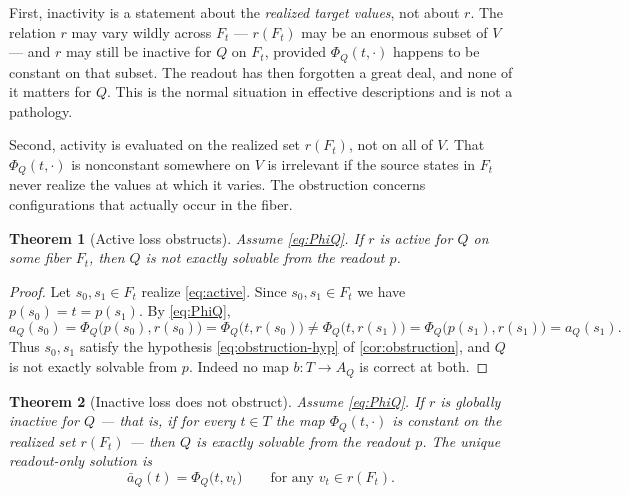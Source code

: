 \documentclass[11pt,reqno]{amsart}
\theoremstyle{plain}
\newtheorem{theorem}{Theorem}[section]
\theoremstyle{definition}
\newcommand{\Rdt}{T}
\begin{document}
First, inactivity is a statement about the \emph{realized target values}, not about $r$. The
relation $r$ may vary wildly across $F_t$ --- $r(F_t)$ may be an enormous subset of $V$ --- and
$r$ may still be inactive for $Q$ on $F_t$, provided $\Phi_Q(t,\cdot)$ happens to be constant on
that subset. The readout has then forgotten a great deal, and none of it matters for $Q$. This
is the normal situation in effective descriptions and is not a pathology.

Second, activity is evaluated on the realized set $r(F_t)$, not on all of $V$. That
$\Phi_Q(t,\cdot)$ is nonconstant somewhere on $V$ is irrelevant if the source states in $F_t$
never realize the values at which it varies. The obstruction concerns configurations that
actually occur in the fiber.

\begin{theorem}[Active loss obstructs]\label{thm:active-obstructs}
Assume \eqref{eq:PhiQ}. If $r$ is active for $Q$ on some fiber $F_{t}$, then $Q$ is not exactly
solvable from the readout $p$.
\end{theorem}

\begin{proof}
Let $s_0,s_1\in F_{t}$ realize \eqref{eq:active}. Since $s_0,s_1\in F_{t}$ we have
$p(s_0)=t=p(s_1)$. By \eqref{eq:PhiQ},
\begin{equation*}
a_Q(s_0)=\Phi_Q\bigl(p(s_0),r(s_0)\bigr)=\Phi_Q\bigl(t,r(s_0)\bigr)
\neq
\Phi_Q\bigl(t,r(s_1)\bigr)=\Phi_Q\bigl(p(s_1),r(s_1)\bigr)=a_Q(s_1).
\end{equation*}
Thus $s_0,s_1$ satisfy the hypothesis \eqref{eq:obstruction-hyp} of \cref{cor:obstruction}, and
$Q$ is not exactly solvable from $p$. Indeed no map $b\colon\Rdt\to A_Q$ is correct at both.
\end{proof}

\begin{theorem}[Inactive loss does not obstruct]\label{thm:inactive-preserves}
Assume \eqref{eq:PhiQ}. If $r$ is globally inactive for $Q$ --- that is, if for every $t\in\Rdt$
the map $\Phi_Q(t,\cdot)$ is constant on the realized set $r(F_t)$ --- then $Q$ \emph{is} exactly
solvable from the readout $p$. The unique readout-only solution is
\begin{equation}\label{eq:inactive-solution}
\bar a_Q(t)=\Phi_Q\bigl(t,v_t\bigr)
\qquad\text{for any } v_t\in r(F_t).
\end{equation}
\end{theorem}
\end{document}
